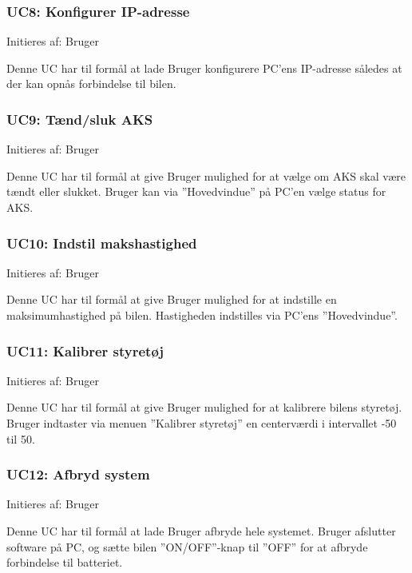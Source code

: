 \subsubsection{UC8: Konfigurer IP-adresse}
Initieres af: Bruger

Denne UC har til formål at lade Bruger konfigurere PC'ens IP-adresse således at der kan opnås forbindelse til bilen.  

\subsubsection{UC9: Tænd/sluk AKS}
Initieres af: Bruger

Denne UC har til formål at give Bruger mulighed for at vælge om AKS skal være tændt eller slukket. Bruger kan via ''Hovedvindue'' på PC'en vælge status for AKS. 

\subsubsection{UC10: Indstil makshastighed}
Initieres af: Bruger

Denne UC har til formål at give Bruger mulighed for at indstille en maksimumhastighed på bilen. Hastigheden indstilles via PC'ens ''Hovedvindue''.

\subsubsection{UC11: Kalibrer styretøj}
Initieres af: Bruger

Denne UC har til formål at give Bruger mulighed for at kalibrere bilens styretøj. Bruger indtaster via menuen ''Kalibrer styretøj'' en centerværdi i intervallet -50 til 50.  

\subsubsection{UC12: Afbryd system}
Initieres af: Bruger

Denne UC har til formål at lade Bruger afbryde hele systemet. Bruger afslutter software på PC, og sætte bilen ''ON/OFF''-knap til ''OFF'' for at afbryde forbindelse til batteriet. 
\clearpage



\clearpage

